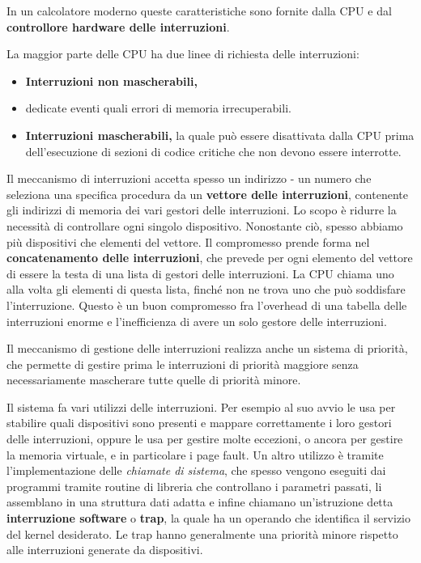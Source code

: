         In un calcolatore moderno queste caratteristiche sono fornite dalla CPU e dal \textbf{controllore hardware delle interruzioni}.
        
        La maggior parte delle CPU ha due linee di richiesta delle interruzioni:
        \begin{itemize}
            \item \textbf{Interruzioni non mascherabili,}\item dedicate eventi quali errori di memoria irrecuperabili.
        
            \item \textbf{Interruzioni mascherabili,} la quale può essere disattivata dalla CPU prima dell'esecuzione di sezioni di codice critiche che non devono essere interrotte.
        \end{itemize}
        
        Il meccanismo di interruzioni accetta spesso un indirizzo - un numero che seleziona una specifica procedura da un \textbf{vettore delle interruzioni}, contenente gli indirizzi di memoria dei vari gestori delle interruzioni. Lo scopo è ridurre la necessità di controllare ogni singolo dispositivo. Nonostante ciò, spesso abbiamo più dispositivi che elementi del vettore. Il compromesso prende forma nel \textbf{concatenamento delle interruzioni}, che prevede per ogni elemento del vettore di essere la testa di una lista di gestori delle interruzioni. La CPU chiama uno alla volta gli elementi di questa lista, finché non ne trova uno che può soddisfare l'interruzione. Questo è un buon compromesso fra l'overhead di una tabella delle interruzioni enorme e l'inefficienza di avere un solo gestore delle interruzioni.
        
        Il meccanismo di gestione delle interruzioni realizza anche un sistema di priorità, che permette di gestire prima le interruzioni di priorità maggiore senza necessariamente mascherare tutte quelle di priorità minore.
        
        Il sistema fa vari utilizzi delle interruzioni. Per esempio al suo avvio le usa per stabilire quali dispositivi sono presenti e mappare correttamente i loro gestori delle interruzioni, oppure le usa per gestire molte eccezioni, o ancora per gestire la memoria virtuale, e in particolare i page fault. Un altro utilizzo è tramite l'implementazione delle \textit{chiamate di sistema}, che spesso vengono eseguiti dai programmi tramite routine di libreria che controllano i parametri passati, li assemblano in una struttura dati adatta e infine chiamano un'istruzione detta \textbf{interruzione software} o \textbf{trap}, la quale ha un operando che identifica il servizio del kernel desiderato. Le trap hanno generalmente una priorità minore rispetto alle interruzioni generate da dispositivi.
        
